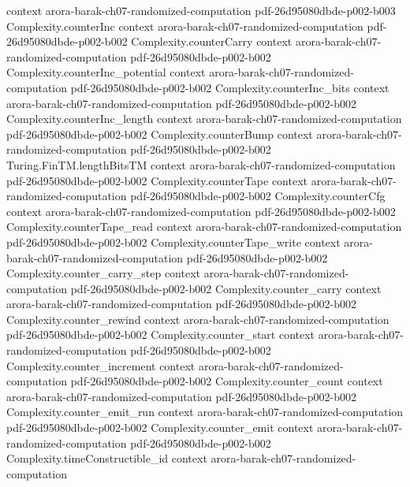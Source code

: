\begin{theorem}
  {context}
  {arora-barak-ch07-randomized-computation}
  {pdf-26d95080dbde-p002-b003}
\proofstep
  {Complexity.counterInc}
  {context}
  {arora-barak-ch07-randomized-computation}
  {pdf-26d95080dbde-p002-b002}
\proofstep
  {Complexity.counterCarry}
  {context}
  {arora-barak-ch07-randomized-computation}
  {pdf-26d95080dbde-p002-b002}
\proofstep
  {Complexity.counterInc_potential}
  {context}
  {arora-barak-ch07-randomized-computation}
  {pdf-26d95080dbde-p002-b002}
\proofstep
  {Complexity.counterInc_bits}
  {context}
  {arora-barak-ch07-randomized-computation}
  {pdf-26d95080dbde-p002-b002}
\proofstep
  {Complexity.counterInc_length}
  {context}
  {arora-barak-ch07-randomized-computation}
  {pdf-26d95080dbde-p002-b002}
\proofstep
  {Complexity.counterBump}
  {context}
  {arora-barak-ch07-randomized-computation}
  {pdf-26d95080dbde-p002-b002}
\proofstep
  {Turing.FinTM.lengthBitsTM}
  {context}
  {arora-barak-ch07-randomized-computation}
  {pdf-26d95080dbde-p002-b002}
\proofstep
  {Complexity.counterTape}
  {context}
  {arora-barak-ch07-randomized-computation}
  {pdf-26d95080dbde-p002-b002}
\proofstep
  {Complexity.counterCfg}
  {context}
  {arora-barak-ch07-randomized-computation}
  {pdf-26d95080dbde-p002-b002}
\proofstep
  {Complexity.counterTape_read}
  {context}
  {arora-barak-ch07-randomized-computation}
  {pdf-26d95080dbde-p002-b002}
\proofstep
  {Complexity.counterTape_write}
  {context}
  {arora-barak-ch07-randomized-computation}
  {pdf-26d95080dbde-p002-b002}
\proofstep
  {Complexity.counter_carry_step}
  {context}
  {arora-barak-ch07-randomized-computation}
  {pdf-26d95080dbde-p002-b002}
\proofstep
  {Complexity.counter_carry}
  {context}
  {arora-barak-ch07-randomized-computation}
  {pdf-26d95080dbde-p002-b002}
\proofstep
  {Complexity.counter_rewind}
  {context}
  {arora-barak-ch07-randomized-computation}
  {pdf-26d95080dbde-p002-b002}
\proofstep
  {Complexity.counter_start}
  {context}
  {arora-barak-ch07-randomized-computation}
  {pdf-26d95080dbde-p002-b002}
\proofstep
  {Complexity.counter_increment}
  {context}
  {arora-barak-ch07-randomized-computation}
  {pdf-26d95080dbde-p002-b002}
\proofstep
  {Complexity.counter_count}
  {context}
  {arora-barak-ch07-randomized-computation}
  {pdf-26d95080dbde-p002-b002}
\proofstep
  {Complexity.counter_emit_run}
  {context}
  {arora-barak-ch07-randomized-computation}
  {pdf-26d95080dbde-p002-b002}
\proofstep
  {Complexity.counter_emit}
  {context}
  {arora-barak-ch07-randomized-computation}
  {pdf-26d95080dbde-p002-b002}
\proofstep
  {Complexity.timeConstructible_id}
  {context}
  {arora-barak-ch07-randomized-computation}

\end{theorem}
